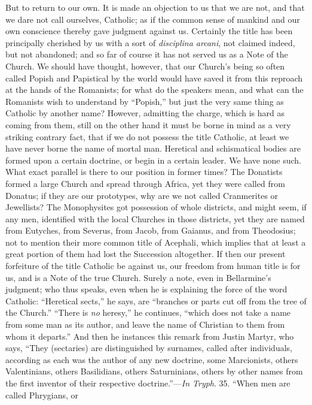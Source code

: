 But to return to our own. It is made an objection
to us that we are not, and that we dare not call ourselves, Catholic;
as if the common sense of mankind and our own conscience thereby gave
judgment against us. Certainly the title has been principally
cherished by us with a sort of \emph{disciplina arcani}, not claimed
indeed, but not abandoned; and so far of course it has not served us
as a Note of the Church. We should have thought, however, that our
Church's being so often called Popish and Papistical by the world
would have saved it from this reproach at the hands of the Romanists;
for what do the speakers mean, and what can the Romanists wish to
understand by ``Popish,'' but just the very same thing as Catholic
by another name? However, admitting the charge, which is hard as
coming from them, still on the other hand it must be borne in mind as
a very striking contrary fact, that if we do not possess the title
Catholic, at least we have never borne the name of mortal man.
Heretical and schismatical bodies are formed upon a certain doctrine,
or begin in a certain leader. We have none such. What exact parallel
is there to our position in former times? The Donatists formed a large
Church and spread through Africa, yet they were called from Donatus;
if they are our prototypes, why are we not called Cranmerites or
Jewellists? The Monophysites got possession of whole districts, and
might seem, if any men, identified with the local Churches in those
districts, yet they are named from Eutyches, from Severus, from Jacob,
from Gaianus, and from Theodosius; not to mention their more common
title of Acephali, which implies that at least a great portion of them
had lost the Succession altogether. If then our present forfeiture of
the title Catholic be against us, our freedom from human title is for
us, and is a Note of the true Church. Surely a note, even in
Bellarmine's judgment; who thus speaks, even when he is explaining
the force of the word Catholic: ``Heretical sects,'' he says, are ``branches or parts cut off from the tree of the Church.''
``There
is \emph{no} heresy,'' he continues, ``which does not take a
name from some man as its author, and leave the name of Christian to
them from whom it departs.'' And then he instances this remark from
Justin Martyr, who says, ``They (sectaries) are distinguished by
surnames, called after individuals, according as each was the author
of any new doctrine, some Marcionists, others Valentinians, others
Basilidians, others Saturninians, others by other names from the first
inventor of their respective doctrine.''—\emph{In Tryph}. 35. ``When men are called Phrygians, or
